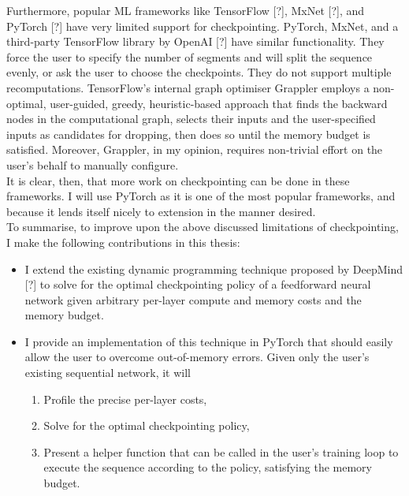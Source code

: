 Furthermore, popular ML frameworks like TensorFlow [?], MxNet [?], and PyTorch [?] have very limited support for checkpointing. PyTorch, MxNet, and a third-party TensorFlow library by OpenAI [?] have similar functionality. They force the user to specify the number of segments and will split the sequence evenly, or ask the user to choose the checkpoints. They do not support multiple recomputations. TensorFlow's internal graph optimiser Grappler employs a non-optimal, user-guided, greedy, heuristic-based approach that finds the backward nodes in the computational graph, selects their inputs and the user-specified inputs as candidates for dropping, then does so until the memory budget is satisfied. Moreover, Grappler, in my opinion, requires non-trivial effort on the user's behalf to manually configure. \\

It is clear, then, that more work on checkpointing can be done in these frameworks. I will use PyTorch as it is one of the most popular frameworks, and because it lends itself nicely to extension in the manner desired.  \\

To summarise, to improve upon the above discussed limitations of checkpointing, I make the following contributions in this thesis:
\begin{itemize}
    \item I extend the existing dynamic programming technique proposed by DeepMind [?] to solve for the optimal checkpointing policy of a feedforward neural network given arbitrary per-layer compute and memory costs and the memory budget.
    \item I provide an implementation of this technique in PyTorch that should easily allow the user to overcome out-of-memory errors. Given only the user's existing sequential network, it will
    \begin{enumerate}
        \item Profile the precise per-layer costs,
        \item Solve for the optimal checkpointing policy,
        \item Present a helper function that can be called in the user's training loop to execute the sequence according to the policy, satisfying the memory budget.
    \end{enumerate}
\end{itemize}

